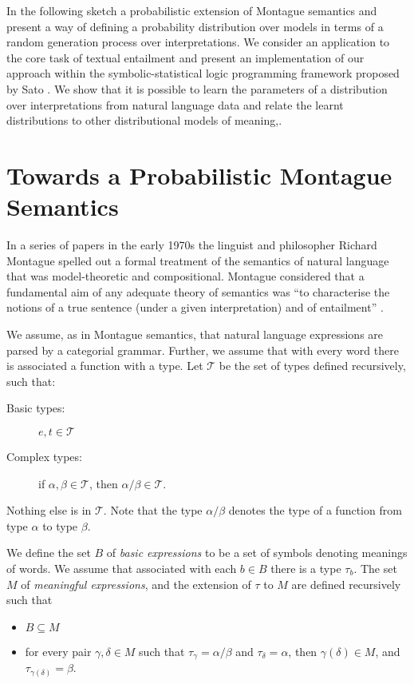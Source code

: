 \documentclass[letterpaper]{article}
\begin{document}
In the following sketch a probabilistic extension of Montague semantics and present a way of defining a probability distribution over models in terms of  a random generation process over interpretations.  We consider an application to the core task of textual entailment and present an implementation of our approach within the symbolic-statistical logic programming framework proposed by Sato \cite{Sato:95}. We show that it is possible to learn the parameters of a distribution over interpretations from natural language data and relate the learnt distributions to other distributional models of meaning,.





\section{Towards a Probabilistic Montague Semantics}


In a series of papers in the early 1970s \cite{Montague1970a,Montague1970b,Montague1973} the linguist and philosopher Richard Montague spelled out a formal treatment of the semantics of natural language that was model-theoretic and compositional. 
Montague considered that a fundamental aim of any adequate theory of semantics was ``to characterise the notions of a true sentence (under a given interpretation) and of entailment'' \cite{Montague1970b}. 


We assume, as in Montague semantics, that natural language expressions
are parsed by a categorial grammar. Further, we assume that with every word there is
associated a function with a type. Let $\mathcal{T}$ be the set of types defined
recursively, such that:
\begin{description}
\item [Basic types:] $e,t\in \mathcal{T}$
\item[Complex types:]  if $\alpha, \beta\in \mathcal{T}$, then $\alpha/\beta\in \mathcal{T}$.
\end{description}
Nothing else is in $\mathcal{T}$. Note that the type $\alpha/\beta$ denotes the type of a function from type
$\alpha$ to type $\beta$.

We define the set $B$ of \emph{basic expressions} to be a set of
symbols denoting meanings of words. We assume that associated with
each $b\in B$ there is a type $\tau_b$. The set $M$ of
\emph{meaningful expressions}, and the extension of $\tau$ to $M$ are
defined recursively such that
\begin{itemize}
\item $B\subseteq M$
\item for every pair $\gamma,\delta\in M$ such that $\tau_\gamma =
  \alpha/\beta$ and $\tau_\delta = \alpha$, then $\gamma(\delta)\in
  M$, and $\tau_{\gamma(\delta)} = \beta$.
\end{itemize}
\end{document}
